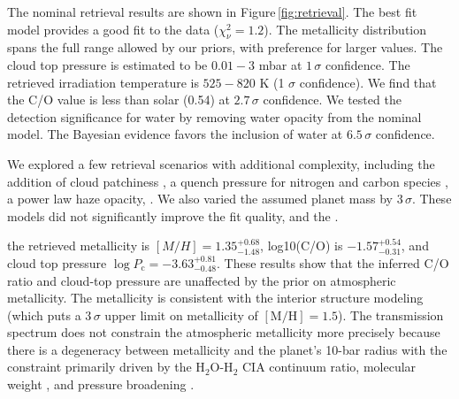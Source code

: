 \documentclass[twocolumn, trackchanges]{aastex61}
\begin{document}

The nominal retrieval results are shown in Figure\,\ref{fig:retrieval}.  The best fit model provides a good fit to the data ($\chi^2_\nu = 1.2$).  The metallicity distribution spans the full range allowed by our priors, with preference for larger values. The cloud top pressure is estimated to be $0.01 - 3$ mbar at $1\,\sigma$ confidence. The retrieved irradiation temperature is $525 - 820$ K (1 $\sigma$ confidence).  We find that the C/O value is less than solar (0.54) at $2.7\,\sigma$ confidence.  We tested the detection significance for water by removing water opacity from the nominal model. The Bayesian evidence favors the inclusion of water at $6.5\,\sigma$ confidence. 

We explored a few retrieval scenarios with additional complexity, including the addition of cloud patchiness \citep{line16}, a quench pressure for nitrogen and carbon species \citep[e.g.][]{morley17}, a power law haze opacity, .  We also varied the assumed planet mass by $3\,\sigma$. These models did not significantly improve the fit quality, and the .  

 the retrieved metallicity is $[M/H] = 1.35^{+0.68}_{-1.48}$, log10(C/O) is $-1.57^{+0.54}_{-0.31}$, and cloud top pressure $\log P_\mathrm{c} = -3.63^{+0.81}_{-0.48}.$ These results show that the inferred C/O ratio and cloud-top pressure are unaffected by the prior on atmospheric metallicity.  The metallicity is consistent with the interior structure modeling (which puts a $3\,\sigma$ upper limit on metallicity of $[\mathrm{M/H}] = 1.5$). The transmission spectrum does not constrain the atmospheric metallicity more precisely because there is a degeneracy between metallicity and the planet's 10-bar radius \citep[e.g]{griffith14,heng17} with the constraint primarily driven by the H$_2$O-H$_2$ CIA continuum ratio, molecular weight \citep{line16}, and pressure broadening \citep{dewit13}. 
\end{document}
